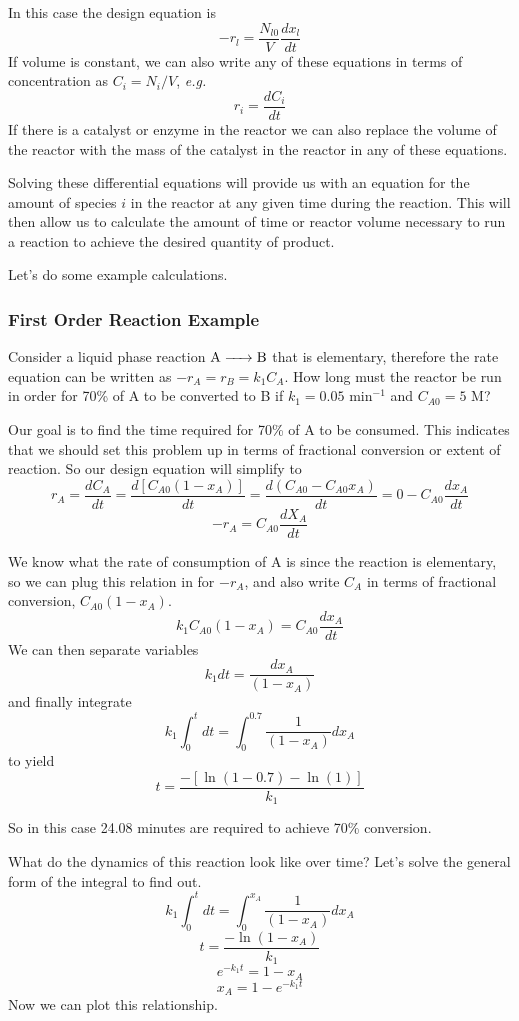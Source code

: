 \documentclass[
]{article}
\begin{document}
In this case the design equation is
\[-r_l = \frac{N_{l0}}{V} \frac{dx_l}{dt}\]
If volume is constant, we can also write any of these equations in terms of concentration as \(C_i = N_i / V\), \emph{e.g.}
\[r_i =\frac{dC_i}{dt}\]
If there is a catalyst or enzyme in the reactor we can also replace the volume of the reactor with the mass of the catalyst in the reactor in any of these equations.

Solving these differential equations will provide us with an equation for the amount of species \(i\) in the reactor at any given time during the reaction. This will then allow us to calculate the amount of time or reactor volume necessary to run a reaction to achieve the desired quantity of product.

Let's do some example calculations.

\hypertarget{first-order-reaction-example}{%
\subsubsection{First Order Reaction Example}\label{first-order-reaction-example}}

Consider a liquid phase reaction \(\ce{A -> B}\) that is elementary, therefore the rate equation can be written as \(-r_A = r_B = k_1C_A\). How long must the reactor be run in order for 70\% of A to be converted to B if \(k_1 = 0.05 \text{ min}^{-1}\) and \(C_{A0} = 5 \text{ M}\)?

Our goal is to find the time required for 70\% of A to be consumed. This indicates that we should set this problem up in terms of fractional conversion or extent of reaction. So our design equation will simplify to
\[r_A = \frac{dC_A}{dt} = \frac{d[C_{A0}(1-x_A)]}{dt} = \frac{d(C_{A0}-C_{A0}x_A)}{dt} = 0-C_{A0}\frac{dx_A}{dt}\]
\[-r_A = C_{A0}\frac{dX_A}{dt}\]

We know what the rate of consumption of A is since the reaction is elementary, so we can plug this relation in for \(-r_A\), and also write \(C_A\) in terms of fractional conversion, \(C_{A0}(1-x_A)\).
\[k_1C_{A0}(1-x_A) =  C_{A0} \frac{dx_A}{dt}\]
We can then separate variables
\[k_1dt = \frac{dx_A}{(1-x_A)}\]
and finally integrate
\[k_1\int_0^tdt = \int_0^{0.7}\frac{1}{(1-x_A)} dx_A\]
to yield
\[t = \frac{-[\ln(1-0.7)-\ln(1)]}{k_1}\]

So in this case 24.08 minutes are required to achieve 70\% conversion.

What do the dynamics of this reaction look like over time? Let's solve the general form of the integral to find out.
\[k_1\int_0^tdt = \int_0^{x_A}\frac{1}{(1-x_A)} dx_A\]
\[t = \frac{-\ln(1-x_A)}{k_1} \]
\[e^{-k_1t} = 1-x_A\]
\[x_A = 1-e^{-k_1t}\]
Now we can plot this relationship.
\end{document}
